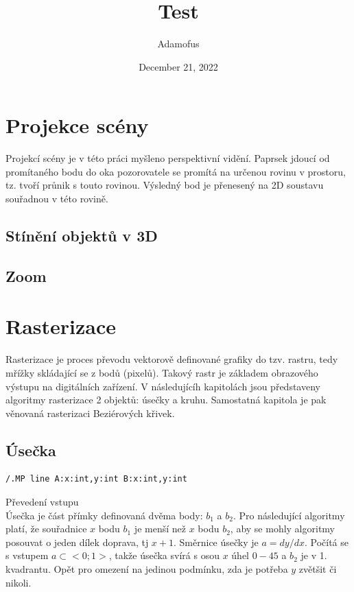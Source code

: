 \documentclass[a4paper,12pt]{book}
\begin{document}
\title{\Large{\textbf{Test}}}
\author{Adamofus}
\date{December 21, 2022}
\maketitle
\let\cleardoublepage\clearpage
\tableofcontents

	
\setcounter{page}{2}



\chapter{Projekce scény}
Projekcí scény je v této práci myšleno perspektivní vidění.
Paprsek jdoucí od promítaného bodu do oka pozorovatele se promítá na určenou rovinu v prostoru, tz. tvoří průnik s touto rovinou. Výsledný bod je přenesený na 2D soustavu souřadnou v této rovině.



\section{Stínění objektů v 3D}
\section{Zoom}




\chapter{Rasterizace}


Rasterizace je proces převodu vektorově definované grafiky do tzv. rastru, tedy mřížky skládající se z bodů (pixelů).
Takový rastr je základem obrazového výstupu na digitálních zařízení.
V následujícíh kapitolách jsou představeny algoritmy rasterizace 2 objektů: úsečky a kruhu.
Samostatná kapitola je pak věnovaná rasterizaci Beziérových křivek.


\section{Úsečka}


\begin{lstlisting}
/.MP line A:x:int,y:int B:x:int,y:int
\end{lstlisting}

Převedení vstupu\\
Úsečka je část přímky definovaná dvěma body: $b_1$ a $b_2$.
Pro následující algoritmy platí, že souřadnice $x$ bodu $b_1$ je menší než $x$ bodu $b_2$, aby se mohly algoritmy posouvat o jeden dílek doprava, tj $x+1$.
Směrnice úsečky je $a = dy/dx$. 
Počítá se s vstupem $a\subset<0;1>$, takže úsečka svírá s osou $x$ úhel $0-45$ a $b_2$ je v 1. kvadrantu. Opět pro omezení na jedinou podmínku, zda je potřeba $y$ zvětšit či nikoli.
\end{document}
